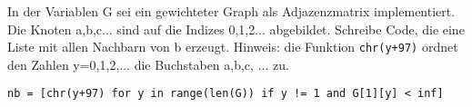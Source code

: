 ﻿\question[3]
In der Variablen G sei ein gewichteter Graph als Adjazenzmatrix implementiert.
Die Knoten a,b,c... sind auf die Indizes 0,1,2... abgebildet.
Schreibe Code, die eine Liste mit allen Nachbarn von b erzeugt.
Hinweis: die Funktion \texttt{chr(y+97)} ordnet den Zahlen y=0,1,2,... die Buchstaben
a,b,c, ... zu.

\begin{solutionbox}{2cm}
\begin{lstlisting}
nb = [chr(y+97) for y in range(len(G)) if y != 1 and G[1][y] < inf]

\end{lstlisting}
\end{solutionbox}

